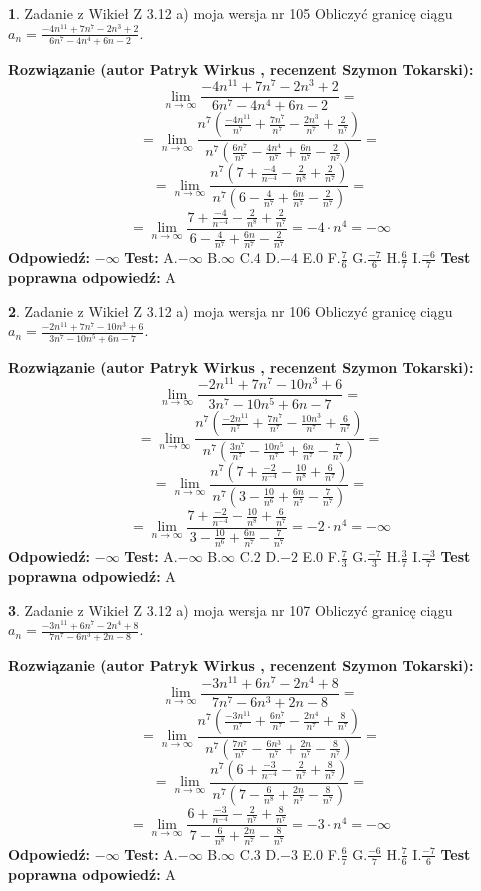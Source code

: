\documentclass[12pt, a4paper]{article}
\theoremstyle{definition} %
\newtheorem{zad}{}
\newcommand{\zadStart}[1]{\begin{zad}#1\newline}
\newcommand{\zadStop}{\end{zad}}
\newcommand{\rozwStart}[2]{\noindent \textbf{Rozwiązanie (autor #1 , recenzent #2): }\newline}
\newcommand{\rozwStop}{\newline}
\newcommand{\odpStart}{\noindent \textbf{Odpowiedź:}\newline}
\newcommand{\odpStop}{\newline}
\newcommand{\testStart}{\noindent \textbf{Test:}\newline}
\newcommand{\testStop}{\newline}
\newcommand{\kluczStart}{\noindent \textbf{Test poprawna odpowiedź:}\newline}
\newcommand{\kluczStop}{\newline}
\begin{document}
\zadStart{Zadanie z Wikieł Z 3.12 a) moja wersja nr 105}
Obliczyć granicę ciągu $a_{n}=\frac{-4n^{11}+7n^{7}-2n^{3}+2}{6n^{7}-4n^{4}+6n-2}$.
\zadStop
\rozwStart{Patryk Wirkus}{Szymon Tokarski}
$$\lim\limits_{n\to\infty}\frac{-4n^{11}+7n^{7}-2n^{3}+2}{6n^{7}-4n^{4}+6n-2}=$$
$$=\lim\limits_{n\to\infty}\frac{n^{7}\left(\frac{-4n^{11}}{n^{7}}+\frac{7n^{7}}{n^{7}}-\frac{2n^{3}}{n^{7}}+\frac{2}{n^{7}}\right)}{n^{7}\left(\frac{6n^{7}}{n^{7}}-\frac{4n^{4}}{n^{7}}+\frac{6n}{n^{7}}-\frac{2}{n^{7}}\right)}=$$
$$=\lim\limits_{n\to\infty}\frac{n^{7}\left(7+\frac{-4}{n^{-4}}-\frac{2}{n^{8}}+\frac{2}{n^{7}}\right)}
{n^{7}\left(6-\frac{4}{n^{7}}+\frac{6n}{n^{7}}-\frac{2}{n^{7}}\right)}=$$
$$=\lim\limits_{n\to\infty}\frac{7+\frac{-4}{n^{-4}}-\frac{2}{n^{8}}+\frac{2}{n^{7}}}{6-\frac{4}{n^{7}}+\frac{6n}{n^{7}}-\frac{2}{n^{7}}}=-4\cdot n^{4} = -\infty$$
\rozwStop
\odpStart
$-\infty$
\odpStop
\testStart
A.$-\infty$
B.$\infty$
C.$4$
D.$-4$
E.$0$
F.$\frac{7}{6}$
G.$\frac{-7}{6}$
H.$\frac{6}{7}$
I.$\frac{-6}{7}$
\testStop
\kluczStart
A
\kluczStop



\zadStart{Zadanie z Wikieł Z 3.12 a) moja wersja nr 106}
Obliczyć granicę ciągu $a_{n}=\frac{-2n^{11}+7n^{7}-10n^{3}+6}{3n^{7}-10n^{5}+6n-7}$.
\zadStop
\rozwStart{Patryk Wirkus}{Szymon Tokarski}
$$\lim\limits_{n\to\infty}\frac{-2n^{11}+7n^{7}-10n^{3}+6}{3n^{7}-10n^{5}+6n-7}=$$
$$=\lim\limits_{n\to\infty}\frac{n^{7}\left(\frac{-2n^{11}}{n^{7}}+\frac{7n^{7}}{n^{7}}-\frac{10n^{3}}{n^{7}}+\frac{6}{n^{7}}\right)}{n^{7}\left(\frac{3n^{7}}{n^{7}}-\frac{10n^{5}}{n^{7}}+\frac{6n}{n^{7}}-\frac{7}{n^{7}}\right)}=$$
$$=\lim\limits_{n\to\infty}\frac{n^{7}\left(7+\frac{-2}{n^{-4}}-\frac{10}{n^{8}}+\frac{6}{n^{7}}\right)}
{n^{7}\left(3-\frac{10}{n^{6}}+\frac{6n}{n^{7}}-\frac{7}{n^{7}}\right)}=$$
$$=\lim\limits_{n\to\infty}\frac{7+\frac{-2}{n^{-4}}-\frac{10}{n^{8}}+\frac{6}{n^{7}}}{3-\frac{10}{n^{6}}+\frac{6n}{n^{7}}-\frac{7}{n^{7}}}=-2\cdot n^{4} = -\infty$$
\rozwStop
\odpStart
$-\infty$
\odpStop
\testStart
A.$-\infty$
B.$\infty$
C.$2$
D.$-2$
E.$0$
F.$\frac{7}{3}$
G.$\frac{-7}{3}$
H.$\frac{3}{7}$
I.$\frac{-3}{7}$
\testStop
\kluczStart
A
\kluczStop



\zadStart{Zadanie z Wikieł Z 3.12 a) moja wersja nr 107}
Obliczyć granicę ciągu $a_{n}=\frac{-3n^{11}+6n^{7}-2n^{4}+8}{7n^{7}-6n^{3}+2n-8}$.
\zadStop
\rozwStart{Patryk Wirkus}{Szymon Tokarski}
$$\lim\limits_{n\to\infty}\frac{-3n^{11}+6n^{7}-2n^{4}+8}{7n^{7}-6n^{3}+2n-8}=$$
$$=\lim\limits_{n\to\infty}\frac{n^{7}\left(\frac{-3n^{11}}{n^{7}}+\frac{6n^{7}}{n^{7}}-\frac{2n^{4}}{n^{7}}+\frac{8}{n^{7}}\right)}{n^{7}\left(\frac{7n^{7}}{n^{7}}-\frac{6n^{3}}{n^{7}}+\frac{2n}{n^{7}}-\frac{8}{n^{7}}\right)}=$$
$$=\lim\limits_{n\to\infty}\frac{n^{7}\left(6+\frac{-3}{n^{-4}}-\frac{2}{n^{7}}+\frac{8}{n^{7}}\right)}
{n^{7}\left(7-\frac{6}{n^{8}}+\frac{2n}{n^{7}}-\frac{8}{n^{7}}\right)}=$$
$$=\lim\limits_{n\to\infty}\frac{6+\frac{-3}{n^{-4}}-\frac{2}{n^{7}}+\frac{8}{n^{7}}}{7-\frac{6}{n^{8}}+\frac{2n}{n^{7}}-\frac{8}{n^{7}}}=-3\cdot n^{4} = -\infty$$
\rozwStop
\odpStart
$-\infty$
\odpStop
\testStart
A.$-\infty$
B.$\infty$
C.$3$
D.$-3$
E.$0$
F.$\frac{6}{7}$
G.$\frac{-6}{7}$
H.$\frac{7}{6}$
I.$\frac{-7}{6}$
\testStop
\kluczStart
A
\kluczStop
\end{document}
